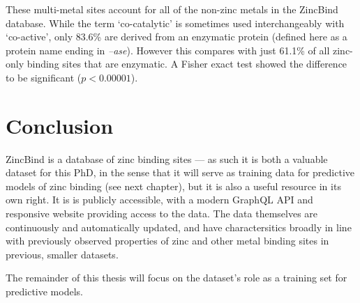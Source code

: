 These multi-metal sites account for all of the non-zinc metals in the ZincBind database. While the term `co-catalytic' is sometimes used interchangeably with `co-active', only 83.6\% are derived from an enzymatic protein (defined here as a protein name ending in \emph{--ase}). However this compares with just 61.1\% of all zinc-only binding sites that are enzymatic. A Fisher exact test showed the difference to be significant ($p<0.00001$).

\section{Conclusion}

ZincBind is a database of zinc binding sites --- as such it is both a valuable dataset for this PhD, in the sense that it will serve as training data for predictive models of zinc binding (see next chapter), but it is also a useful resource in its own right. It is is publicly accessible, with a modern GraphQL API and responsive website providing access to the data. The data themselves are continuously and automatically updated, and have charactersitics broadly in line with previously observed properties of zinc and other metal binding sites in previous, smaller datasets.

The remainder of this thesis will focus on the dataset's role as a training set for predictive models.